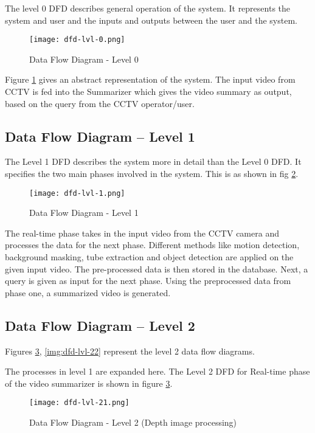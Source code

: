     The level 0 DFD describes general operation of the system. It represents the system and user and the inputs and outputs between the user and the system.

    \begin{figure}[H]
        \centering
        \texttt{[image: dfd-lvl-0.png]}
        \caption{Data Flow Diagram - Level 0 }
        \label{img:dfd-lvl-0}
    \end{figure}

    Figure \ref{img:dfd-lvl-0} gives an abstract representation of the system. The input video from CCTV is fed into the Summarizer which gives the video summary as output, based on the query from the CCTV operator/user.


    \subsection{Data Flow Diagram – Level 1}

    The Level 1 DFD describes the system more in detail than the Level 0 DFD. It specifies the two main phases involved in the system. This is as shown in fig \ref{img:dfd-lvl-1}.

    \begin{figure}[H]
        \centering
        \texttt{[image: dfd-lvl-1.png]}
        \caption{Data Flow Diagram - Level 1 }
        \label{img:dfd-lvl-1}
    \end{figure}

    The real-time phase takes in the input video from the CCTV camera and processes the data for the next phase. Different methods like motion detection, background masking, tube extraction and object detection are applied on the given input video. The pre-processed data is then stored in the database. Next, a query is given as input for the next phase. Using the preprocessed data from phase one, a summarized video is generated.

    \subsection{Data Flow Diagram – Level 2}

    Figures \ref{img:dfd-lvl-21}, \ref{img:dfd-lvl-22} represent the level 2 data flow diagrams.

    The processes in level 1 are expanded here. The Level 2 DFD for Real-time phase of the video summarizer is shown in figure \ref{img:dfd-lvl-21}.

    \begin{figure}[H]
        \centering
        \texttt{[image: dfd-lvl-21.png]}
        \caption {Data Flow Diagram - Level 2 (Depth image processing)}
        \label{img:dfd-lvl-21}
    \end{figure}

